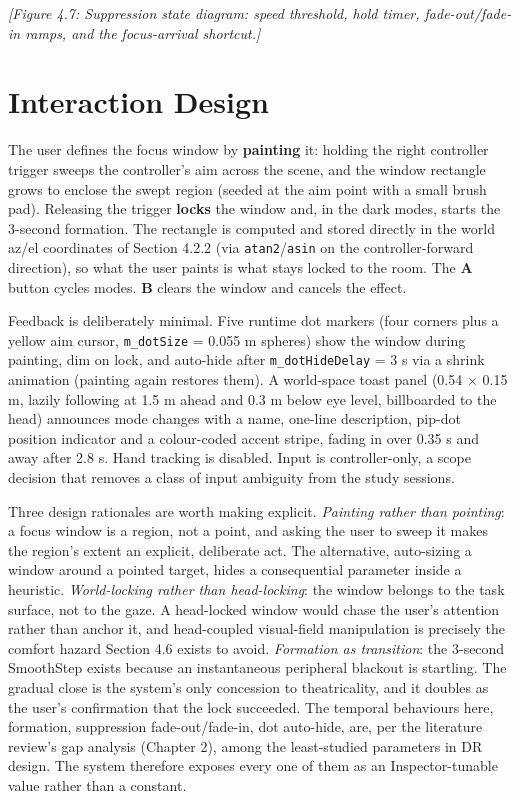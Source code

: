 \textit{[Figure 4.7: Suppression state diagram: speed threshold, hold timer, fade-out/fade-in ramps, and
the focus-arrival shortcut.]}

\section{Interaction Design}

The user defines the focus window by \textbf{painting} it: holding the right controller trigger sweeps
the controller's aim across the scene, and the window rectangle grows to enclose the swept region
(seeded at the aim point with a small brush pad). Releasing the trigger \textbf{locks} the window and, in
the dark modes, starts the 3-second formation. The rectangle is computed and stored directly in the
world az/el coordinates of Section 4.2.2 (via \verb|atan2|/\verb|asin| on the controller-forward direction),
so what the user paints is what stays locked to the room. The \textbf{A} button cycles modes. \textbf{B}
clears the window and cancels the effect.

Feedback is deliberately minimal. Five runtime dot markers (four corners plus a yellow aim cursor,
\verb|m_dotSize| = 0.055 m spheres) show the window during painting, dim on lock, and auto-hide after
\verb|m_dotHideDelay| = 3 s via a shrink animation (painting again restores them). A world-space toast
panel (0.54 $\times$ 0.15 m, lazily following at 1.5 m ahead and 0.3 m below eye level, billboarded to the
head) announces mode changes with a name, one-line description, pip-dot position indicator and a
colour-coded accent stripe, fading in over 0.35 s and away after 2.8 s. Hand tracking is disabled.
Input is controller-only, a scope decision that removes a class of input ambiguity from the study
sessions.

Three design rationales are worth making explicit. \textit{Painting rather than pointing}: a focus window is
a region, not a point, and asking the user to sweep it makes the region's extent an explicit,
deliberate act. The alternative, auto-sizing a window around a pointed target, hides a consequential
parameter inside a heuristic. \textit{World-locking rather than head-locking}: the window belongs to the
task surface, not to the gaze. A head-locked window would chase the user's attention rather than
anchor it, and head-coupled visual-field manipulation is precisely the comfort hazard Section 4.6
exists to avoid. \textit{Formation as transition}: the 3-second SmoothStep exists because an instantaneous
peripheral blackout is startling. The gradual close is the system's only concession to theatricality,
and it doubles as the user's confirmation that the lock succeeded. The temporal behaviours here,
formation, suppression fade-out/fade-in, dot auto-hide, are, per the literature review's gap
analysis (Chapter 2), among the least-studied parameters in DR design. The system therefore exposes
every one of them as an Inspector-tunable value rather than a constant.

